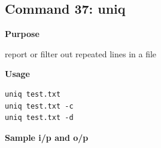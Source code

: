 \documentclass{article}
\begin{document}
\subsection{Command 37: uniq} 
\textbf{Purpose}
\begin{flushleft}
 report or filter out repeated lines in a file
\end{flushleft}
\textbf{Usage}
\begin{verbatim}
uniq test.txt
uniq test.txt -c
uniq test.txt -d
\end{verbatim}
\textbf{Sample i/p and o/p}
\begin{figure}[H] 
\end{figure}
\end{document}
